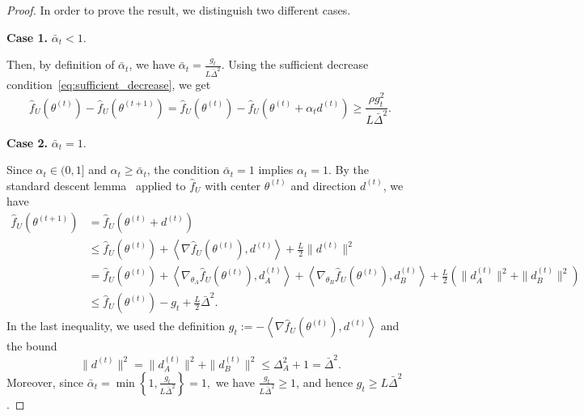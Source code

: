 \documentclass{article}
\begin{document}
\begin{proof}
In order to prove the result, we distinguish two different cases.

\textbf{Case 1.} \(\bar{\alpha}_t<1\).

Then, by definition of \(\bar{\alpha}_t\), we have
$\bar{\alpha}_t
    =
    \frac{g_t}{L\bar\Delta^2}.
$
Using the sufficient decrease condition~\eqref{eq:sufficient_decrease}, we get
\begin{equation}\label{eq:case1}
    \widehat f_U(\theta^{(t)})
    -
    \widehat f_U(\theta^{(t+1)})
    =
    \widehat f_U(\theta^{(t)})
    -
    \widehat f_U(\theta^{(t)}+\alpha_t d^{(t)})
    \ge
    \frac{\rho g_t^2}{L\bar\Delta^2}.
\end{equation}

\textbf{Case 2.} \(\bar{\alpha}_t=1\).

Since \(\alpha_t\in(0,1]\) and \(\alpha_t\ge \bar{\alpha}_t\), the condition
\(\bar{\alpha}_t=1\) implies \(\alpha_t=1\). By the standard descent lemma~\cite[Proposition 6.1.2]{bertsekas2015convex} applied to
\(\widehat f_U\) with center \(\theta^{(t)}\) and direction \(d^{(t)}\), we have
\[
\begin{aligned}
    \widehat f_U(\theta^{(t+1)})
    &=
    \widehat f_U(\theta^{(t)}+d^{(t)})                                      \\
    &\le
    \widehat f_U(\theta^{(t)})
    +
    \left\langle
        \nabla \widehat f_U(\theta^{(t)}),
        d^{(t)}
    \right\rangle
    +
    \frac{L}{2}\|d^{(t)}\|^2                                            \\
    &=
    \widehat f_U(\theta^{(t)})
    +
    \left\langle
        \nabla_{\theta_A}\widehat f_U(\theta^{(t)}),
        d_A^{(t)}
    \right\rangle
    +
    \left\langle
        \nabla_{\theta_B}\widehat f_U(\theta^{(t)}),
        d_B^{(t)}
    \right\rangle
    +
    \frac{L}{2}
    \left(
        \|d_A^{(t)}\|^2+\|d_B^{(t)}\|^2
    \right)                                                            \\
    &\le
    \widehat f_U(\theta^{(t)})
    -
    g_t
    +
    \frac{L}{2}\bar\Delta^2 .
\end{aligned}
\]
In the last inequality, we used the definition
$ g_t
    :=
    -
    \left\langle
        \nabla \widehat f_U(\theta^{(t)}),
        d^{(t)}
    \right\rangle
$
and the bound
\[
    \|d^{(t)}\|^2
    =
    \|d_A^{(t)}\|^2+\|d_B^{(t)}\|^2
    \le
    \Delta_A^2+1
    =
    \bar\Delta^2.
\]
Moreover, since
$\bar{\alpha}_t
    =
    \min\left\{
        1,
        \frac{g_t}{L\bar\Delta^2}
    \right\}
    =
    1,
$
we have $\frac{g_t}{L\bar\Delta^2}\ge 1$, and hence $g_t\ge L\bar\Delta^2$.


\end{proof}
\end{document}

